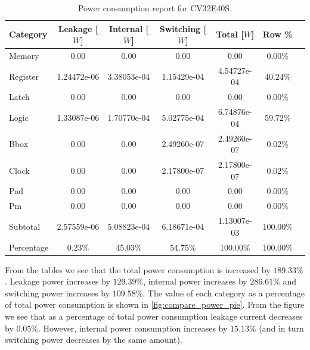 \begin{table}[h]
\centering
\caption{Power consumption report for CV32E40S.}
\label{tab:cv32e40s_power}
\begin{tabular}{l|cccccc}
\toprule
Category & Leakage [$W$] & Internal [$W$] & Switching [$W$] & Total [$W$] & Row \% \\
\midrule
\rowcolor{black!20} Memory & 0.00 & 0.00 & 0.00 & 0.00 & 0.00\% \\
Register & 1.24472e-06 & 3.38053e-04 & 1.15429e-04 & 4.54727e-04 & 40.24\% \\
\rowcolor{black!20}Latch & 0.00 & 0.00 & 0.00 & 0.00 & 0.00\% \\
Logic & 1.33087e-06 & 1.70770e-04 & 5.02775e-04 & 6.74876e-04 & 59.72\% \\
\rowcolor{black!20}Bbox & 0.00 & 0.00 & 2.49260e-07 & 2.49260e-07 & 0.02\% \\
Clock & 0.00 & 0.00 & 2.17800e-07 & 2.17800e-07 & 0.02\% \\
\rowcolor{black!20}Pad & 0.00 & 0.00 & 0.00 & 0.00 & 0.00\% \\
Pm & 0.00 & 0.00 & 0.00 & 0.00 & 0.00\% \\
\midrule
\rowcolor{black!20} Subtotal & 2.57559e-06 & 5.08823e-04 & 6.18671e-04 & 1.13007e-03 & 100.00\% \\
Percentage & 0.23\% & 45.03\% & 54.75\% & 100.00\% & 100.00\% \\
\bottomrule
\end{tabular}
\end{table}


\newpage

From the tables we see that the total power consumption is increased by $189.33\%$. Leakage power increases by $129.39\%$, internal power increases by $286.61\%$ and switching power increases by $109.58\%$. The value of each category as a percentage of total power consumption is shown in \autoref{fig:compare_power_pie}. From the figure we see that as a percentage of total power consumption leakage current decreases by $0.05\%$. However, internal power consumption increases by $15.13\%$ (and in turn switching power decreases by the same amount).  

